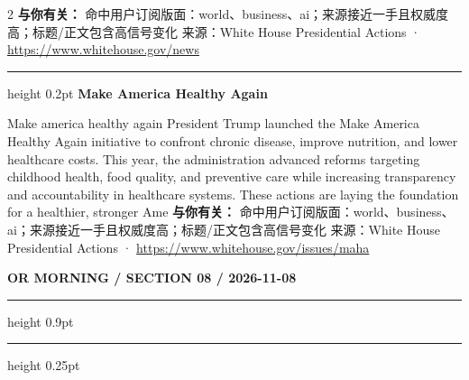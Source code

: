 \documentclass[10.5pt]{ctexart}
\begin{document}
\begin{multicols}{2}
\textbf{与你有关：} 命中用户订阅版面：world、business、ai；来源接近一手且权威度高；标题/正文包含高信号变化
{\footnotesize\color{ormuted} 来源：White House Presidential Actions · \url{https://www.whitehouse.gov/news}}
\vspace{2mm}
\hrule height 0.2pt
\vspace{2mm}
{\large\bfseries Make America Healthy Again}\par
Make america healthy again President Trump launched the Make America Healthy Again initiative to confront chronic disease, improve nutrition, and lower healthcare costs. This year, the administration advanced reforms targeting childhood health, food quality, and preventive care while increasing transparency and accountability in healthcare systems. These actions are laying the foundation for a healthier, stronger Ame
\textbf{与你有关：} 命中用户订阅版面：world、business、ai；来源接近一手且权威度高；标题/正文包含高信号变化
{\footnotesize\color{ormuted} 来源：White House Presidential Actions · \url{https://www.whitehouse.gov/issues/maha}}
\end{multicols}
\newpage
{\small\bfseries OR MORNING / SECTION 08 / 2026-11-08}
\vspace{2mm}
\hrule height 0.9pt
\vspace{1.5mm}
\hrule height 0.25pt
\vspace{4mm}
\end{document}

